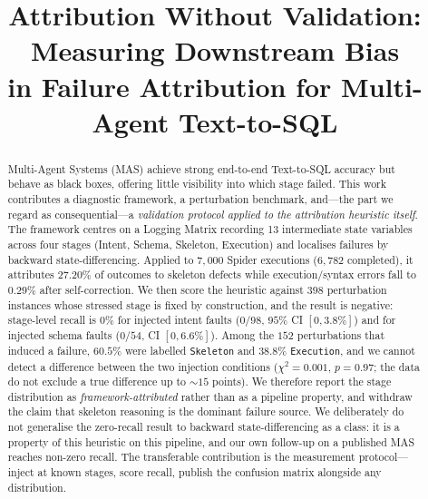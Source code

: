 \documentclass[conference]{IEEEtran}
\begin{document}
\title{Attribution Without Validation: Measuring Downstream Bias\\
in Failure Attribution for Multi-Agent Text-to-SQL\\

}

\author{
\and
{}
}

\maketitle

\begin{abstract}
Multi-Agent Systems (MAS) achieve strong end-to-end Text-to-SQL accuracy but
behave as black boxes, offering little visibility into which stage failed. This
work contributes a diagnostic framework, a perturbation benchmark, and---the
part we regard as consequential---a \emph{validation protocol applied to the
attribution heuristic itself}. The framework centres on a Logging Matrix
recording 13 intermediate state variables across four stages (Intent, Schema,
Skeleton, Execution) and localises failures by backward state-differencing.
Applied to $7{,}000$ Spider executions ($6{,}782$ completed), it attributes
$27.20\%$ of outcomes to skeleton defects while execution/syntax errors fall to
$0.29\%$ after self-correction. We then score the heuristic against $398$
perturbation instances whose stressed stage is fixed by construction, and the
result is negative: stage-level recall is $0\%$ for injected intent faults
($0/98$, $95\%$ CI $[0,3.8\%]$) and for injected schema faults ($0/54$, CI
$[0,6.6\%]$). Among the $152$ perturbations that induced a failure, $60.5\%$
were labelled \texttt{Skeleton} and $38.8\%$ \texttt{Execution}, and we cannot
detect a difference between the two injection conditions ($\chi^2=0.001$,
$p=0.97$; the data do not exclude a true difference up to ${\sim}15$ points).
We therefore report the stage distribution as \emph{framework-attributed}
rather than as a pipeline property, and withdraw the claim that skeleton
reasoning is the dominant failure source. We deliberately do not generalise the
zero-recall result to backward state-differencing as a class: it is a property
of this heuristic on this pipeline, and our own follow-up on a published MAS
reaches non-zero recall. The transferable contribution is the measurement
protocol---inject at known stages, score recall, publish the confusion matrix
alongside any distribution.
\end{abstract}
\end{document}
